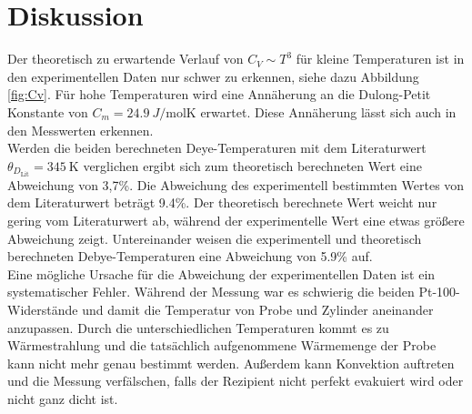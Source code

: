 \section{Diskussion}
\label{sec:Diskussion}
Der theoretisch zu erwartende Verlauf von $C_V \sim T^3$ für kleine
Temperaturen ist in den experimentellen Daten nur schwer zu erkennen, siehe dazu Abbildung \ref{fig:Cv}.
Für hohe Temperaturen wird eine Annäherung an die Dulong-Petit Konstante von
$C_m=\SI{24,9}{J\per\mol\K}$ erwartet. Diese Annäherung lässt sich auch in den
Messwerten erkennen.\\

Werden die beiden berechneten Deye-Temperaturen mit dem Literaturwert
$\theta_{D_\text{Lit}}=\SI{345}{\K}$ \cite{chemie} verglichen ergibt sich zum theoretisch berechneten
Wert eine Abweichung von 3,7\;\%. Die Abweichung des experimentell bestimmten
Wertes von dem Literaturwert beträgt 9.4\;\%.
Der theoretisch berechnete Wert weicht nur gering vom Literaturwert ab, während der experimentelle
Wert eine etwas größere Abweichung zeigt. Untereinander weisen die experimentell
und theoretisch berechneten Debye-Temperaturen eine Abweichung von 5.9\;\% auf.\\
Eine mögliche Ursache für die Abweichung der experimentellen Daten ist ein systematischer Fehler.
Während der Messung war es schwierig die beiden Pt-100-Widerstände und damit die Temperatur
von Probe und Zylinder aneinander anzupassen. Durch die unterschiedlichen Temperaturen kommt
es zu Wärmestrahlung und die tatsächlich aufgenommene Wärmemenge der Probe kann nicht mehr genau bestimmt werden.
Außerdem kann Konvektion auftreten und die Messung verfälschen, falls der Rezipient nicht
perfekt evakuiert wird oder nicht ganz dicht ist.

